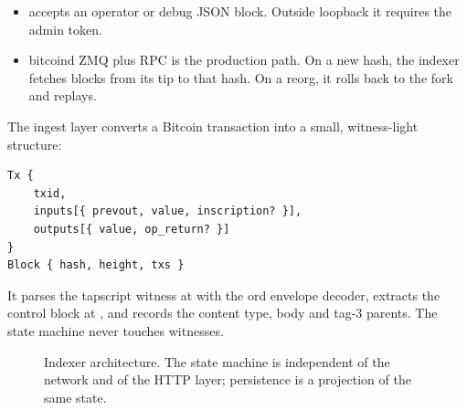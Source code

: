 \begin{itemize}[leftmargin=1.4em,itemsep=0.3em]
  \item {} accepts an operator or debug JSON block.
        Outside loopback it requires the admin token.
  \item bitcoind ZMQ  plus RPC is the production path. On a
        new hash, the indexer fetches blocks from its tip to that hash. On a
        reorg, it rolls back to the fork and replays.
\end{itemize}

The ingest layer converts a Bitcoin transaction into a small, witness-light
structure:
\begin{lstlisting}[language={},caption={Ingest types.},label={lst:ingest}]
Tx {
    txid,
    inputs[{ prevout, value, inscription? }],
    outputs[{ value, op_return? }]
}
Block { hash, height, txs }
\end{lstlisting}
It parses the tapscript witness at  with the ord envelope
decoder, extracts the control block at , and records the
content type, body and tag-3 parents. The state machine never touches
witnesses.

\begin{figure}[htbp]
\centering
{}
\caption{Indexer architecture. The state machine is independent of the
network and of the HTTP layer; persistence is a projection of the same
state.}
\label{fig:indexer}
\end{figure}

